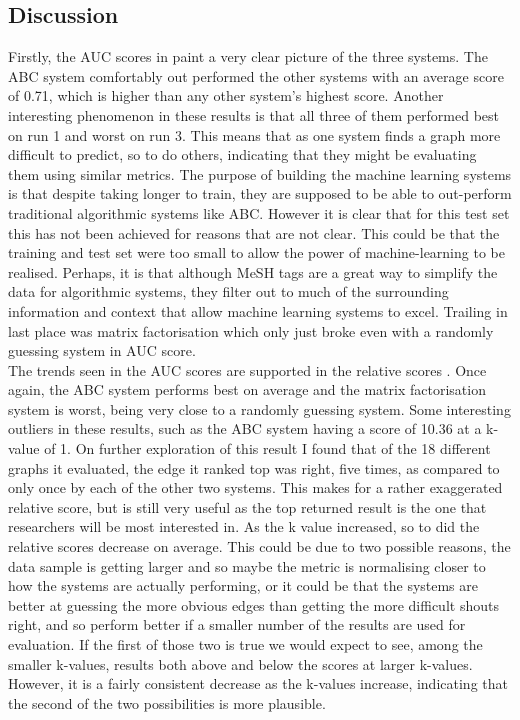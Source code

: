 \documentclass{l4proj}
\begin{document}
\subsection{Discussion}

Firstly, the AUC scores in  paint a very clear picture of the three systems. The ABC system comfortably out performed the other systems with an average score of 0.71, which is higher than any other system's highest score. Another interesting phenomenon in these results is that all three of them performed best on run 1 and worst on run 3. This means that as one system finds a graph more difficult to predict, so to do others, indicating that they might be evaluating them using similar metrics. The purpose of building the machine learning systems is that despite taking longer to train, they are supposed to be able to out-perform traditional algorithmic systems like ABC. However it is clear that for this test set this has not been achieved for reasons that are not clear. This could be that the training and test set were too small to allow the power of machine-learning to be realised. Perhaps, it is that although MeSH tags are a great way to simplify the data for algorithmic systems, they filter out to much of the surrounding information and context that allow machine learning systems to excel. Trailing in last place was matrix factorisation which only just broke even with a randomly guessing system in AUC score. \\

The trends seen in the AUC scores are supported in the relative scores . Once again, the ABC system performs best on average and the matrix factorisation system is worst, being very close to a randomly guessing system. Some interesting outliers in these results, such as the ABC system having a score of 10.36 at a k-value of 1. On further exploration of this result I found that of the 18 different graphs it evaluated, the edge it ranked top was right, five times, as compared to only once by each of the other two systems. This makes for a rather exaggerated relative score, but is still very useful as the top returned result is the one that researchers will be most interested in. As the k value increased, so to did the relative scores decrease on average. This could be due to two possible reasons, the data sample is getting larger and so maybe the metric is normalising closer to how the systems are actually performing, or it could be that the systems are better at guessing the more obvious edges than getting the more difficult shouts right, and so perform better if a smaller number of the results are used for evaluation. If the first of those two is true we would expect to see, among the smaller k-values, results both above and below the scores at larger k-values. However, it is a fairly consistent decrease as the k-values increase, indicating that the second of the two possibilities is more plausible. \\
\end{document}
